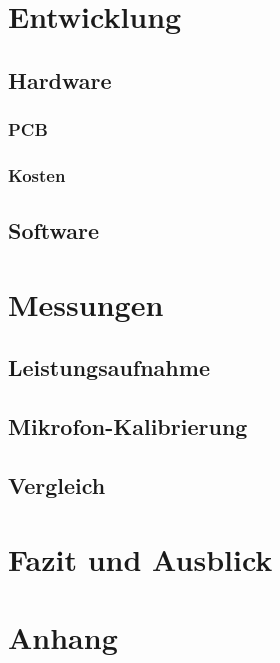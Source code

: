 \documentclass[12pt]{article}
\begin{document}
	\newpage
	\section{Entwicklung}
	\subsection{Hardware}
	\subsubsection{PCB}
	\subsubsection{Kosten}
	\subsection{Software}
	
	\newpage
	\section{Messungen}
	\subsection{Leistungsaufnahme}
	\subsection{Mikrofon-Kalibrierung}
	\subsection{Vergleich}
	
	\newpage
	\section{Fazit und Ausblick}
	
	\newpage
	\section{Anhang}
	
	
	
	
\end{document}
